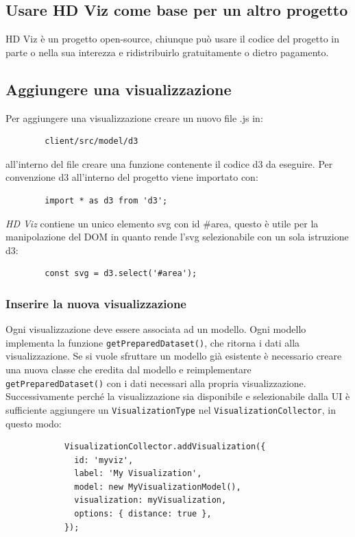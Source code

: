     \subsection{Usare HD Viz come base per un altro progetto}
    HD Viz è un progetto open-source, chiunque può usare il codice del progetto in parte o nella sua interezza e ridistribuirlo gratuitamente o dietro pagamento.
    \subsection{Aggiungere una visualizzazione}
    Per aggiungere una visualizzazione creare un nuovo file .js in:
    \begin{verbatim}
        client/src/model/d3
    \end{verbatim}
    all'interno del file creare una funzione contenente il codice d3 da eseguire. Per convenzione d3 all'interno del progetto viene importato con:
    \begin{verbatim}
        import * as d3 from 'd3';
    \end{verbatim}
    \textit{HD Viz} contiene un unico elemento svg con id \#area, questo è utile per la manipolazione del DOM in quanto rende l'svg selezionabile con un sola istruzione d3:
    \begin{verbatim}
        const svg = d3.select('#area');
    \end{verbatim}
        \subsubsection{Inserire la nuova visualizzazione}
        Ogni visualizzazione deve essere associata ad un modello. Ogni modello implementa la funzione  \texttt{getPreparedDataset()}, che ritorna i dati alla visualizzazione. Se si vuole sfruttare un modello già esistente è necessario creare una nuova classe che eredita dal modello e reimplementare \texttt{getPreparedDataset()} con i dati necessari alla propria visualizzazione. Successivamente perché la visualizzazione sia disponibile e selezionabile dalla UI è sufficiente aggiungere un \texttt{VisualizationType} nel \texttt{VisualizationCollector}, in questo modo:
        \begin{verbatim}
            VisualizationCollector.addVisualization({
              id: 'myviz',
              label: 'My Visualization',
              model: new MyVisualizationModel(),
              visualization: myVisualization,
              options: { distance: true },
            });
        \end{verbatim}
        
